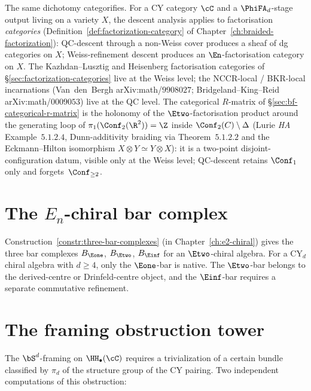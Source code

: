 The same dichotomy categorifies. For a CY category $\cC$ and a $\PhiFA_d$-stage output living on a variety $X$, the descent analysis applies to factorisation \emph{categories} \textup{(}Definition~\ref{def:factorization-category} of Chapter~\ref{ch:braided-factorization}\textup{):} QC-descent through a non-Weiss cover produces a sheaf of dg categories on $X$; Weiss-refinement descent produces an $\En$-factorisation category on $X$. The Kazhdan--Lusztig and Heisenberg factorisation categories of §\ref{sec:factorization-categories} live at the Weiss level; the NCCR-local / BKR-local incarnations \textup{(}Van~den~Bergh arXiv:math/$9908027$; Bridgeland--King--Reid arXiv:math/$0009053$\textup{)} live at the QC level. The categorical $R$-matrix of §\ref{sec:bf-categorical-r-matrix} is the holonomy of the $\Etwo$-factorisation product around the generating loop of $\pi_1(\Conf_2(\R^2)) = \Z$ inside $\Conf_2(C) \setminus \Delta$ \textup{(}Lurie \emph{HA} Example~$5.1.2.4$, Dunn-additivity braiding via Theorem~$5.1.2.2$ and the Eckmann--Hilton isomorphism $X \otimes Y \simeq Y \otimes X$\textup{):} it is a two-point disjoint-configuration datum, visible only at the Weiss level; QC-descent retains $\Conf_1$ only and forgets~$\Conf_{\geq 2}$.


\section{The \texorpdfstring{$E_n$}{E-n}-chiral bar complex}
\label{sec:en-bar}

Construction~\ref{constr:three-bar-complexes} (in Chapter~\ref{ch:e2-chiral}) gives the three bar complexes $B_{\Eone}$, $B_{\Etwo}$, $B_{\Einf}$ for an $\Etwo$-chiral algebra. For a CY$_d$ chiral algebra with $d \geq 4$, only the $\Eone$-bar is native. The $\Etwo$-bar belongs to the derived-centre or Drinfeld-centre object, and the $\Einf$-bar requires a separate commutative refinement.


\section{The framing obstruction tower}
\label{sec:framing-tower}

The $\bS^d$-framing on $\HH_\bullet(\cC)$ requires a trivialization of a certain bundle classified by $\pi_d$ of the structure group of the CY pairing. Two independent computations of this obstruction:

